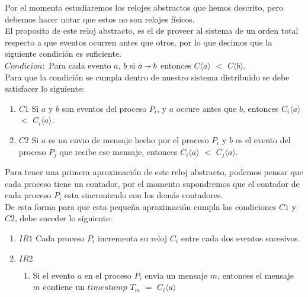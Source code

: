 \documentclass{article}
\begin{document}
\begin{enumerate}
{    Por el momento estudiaremos los relojes abstractos que hemos
    descrito, pero debemos hacer notar que estos no son relojes
    físicos.\\
    El proposito de este reloj abstracto, es el de proveer al sistema
    de un orden total respecto a que eventos ocurren antes que otros,
    por lo que decimos que la siguiente condición es suficiente.\\
    $Condicion:$ Para cada evento $a$, $b$ si $a\shortrightarrow b$
    entonces $C \langle a \rangle$ $<$ $C\langle b \rangle$.\\
    Para que la condición se cumpla dentro de nuestro sistema
    distribuido se debe satisfacer lo siguiente:

    \begin{enumerate}

    \item{$C1$ Si $a$ y $b$ son eventos del proceso $P_i$, y $a$ occure
          antes que $b$, entonces $C_i \langle a \rangle$ $<$ $C_i
          \langle a \rangle$.}

        \item{$C2$ Si $a$ es un envio de mensaje hecho por el proceso
            $P_i$ y $b$ es el evento del proceso $P_j$ que recibe ese
            mensaje, entonces $C_i \langle a \rangle$ $<$ $C_j \langle a
            \rangle$.}

    \end{enumerate}
    
    Para tener una primera aproximación de este reloj abstracto,
    podemos pensar que cada proceso tiene un contador, por el momento
    supondremos que  el contador de cada proceso $P_i$ esta
    sincronizado con los demás contadores.\\
    De esta forma para que esta pequeña aproximación cumpla las
    condiciones $C1$ y $C2$, debe suceder lo siguiente:

    \begin{enumerate}
      
      \item{$IR1$ Cada proceso $P_i$ incrementa su reloj $C_i$ entre
          cada dos eventos sucesivos.}

        \item{$IR2$ 
            \begin{enumerate}

              \item{Si el evento $a$ en el proceso $P_i$ envia un
                  mensaje $m$, entonces el mensaje $m$ contiene un
                  $timestamp$ $T_m$ $=$  $C_i \langle a \rangle$}


\end{enumerate}}
\end{enumerate}}
\end{enumerate}
\end{document}
